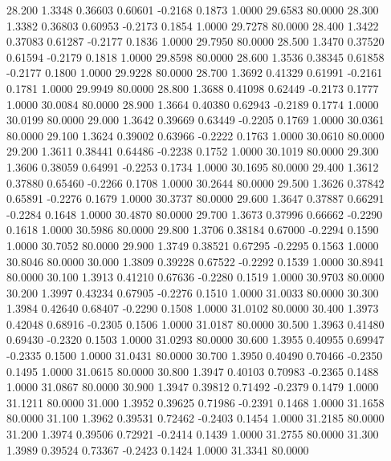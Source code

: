   28.200   1.3348   0.36603   0.60601  -0.2168   0.1873   1.0000  29.6583  80.0000
  28.300   1.3382   0.36803   0.60953  -0.2173   0.1854   1.0000  29.7278  80.0000
  28.400   1.3422   0.37083   0.61287  -0.2177   0.1836   1.0000  29.7950  80.0000
  28.500   1.3470   0.37520   0.61594  -0.2179   0.1818   1.0000  29.8598  80.0000
  28.600   1.3536   0.38345   0.61858  -0.2177   0.1800   1.0000  29.9228  80.0000
  28.700   1.3692   0.41329   0.61991  -0.2161   0.1781   1.0000  29.9949  80.0000
  28.800   1.3688   0.41098   0.62449  -0.2173   0.1777   1.0000  30.0084  80.0000
  28.900   1.3664   0.40380   0.62943  -0.2189   0.1774   1.0000  30.0199  80.0000
  29.000   1.3642   0.39669   0.63449  -0.2205   0.1769   1.0000  30.0361  80.0000
  29.100   1.3624   0.39002   0.63966  -0.2222   0.1763   1.0000  30.0610  80.0000
  29.200   1.3611   0.38441   0.64486  -0.2238   0.1752   1.0000  30.1019  80.0000
  29.300   1.3606   0.38059   0.64991  -0.2253   0.1734   1.0000  30.1695  80.0000
  29.400   1.3612   0.37880   0.65460  -0.2266   0.1708   1.0000  30.2644  80.0000
  29.500   1.3626   0.37842   0.65891  -0.2276   0.1679   1.0000  30.3737  80.0000
  29.600   1.3647   0.37887   0.66291  -0.2284   0.1648   1.0000  30.4870  80.0000
  29.700   1.3673   0.37996   0.66662  -0.2290   0.1618   1.0000  30.5986  80.0000
  29.800   1.3706   0.38184   0.67000  -0.2294   0.1590   1.0000  30.7052  80.0000
  29.900   1.3749   0.38521   0.67295  -0.2295   0.1563   1.0000  30.8046  80.0000
  30.000   1.3809   0.39228   0.67522  -0.2292   0.1539   1.0000  30.8941  80.0000
  30.100   1.3913   0.41210   0.67636  -0.2280   0.1519   1.0000  30.9703  80.0000
  30.200   1.3997   0.43234   0.67905  -0.2276   0.1510   1.0000  31.0033  80.0000
  30.300   1.3984   0.42640   0.68407  -0.2290   0.1508   1.0000  31.0102  80.0000
  30.400   1.3973   0.42048   0.68916  -0.2305   0.1506   1.0000  31.0187  80.0000
  30.500   1.3963   0.41480   0.69430  -0.2320   0.1503   1.0000  31.0293  80.0000
  30.600   1.3955   0.40955   0.69947  -0.2335   0.1500   1.0000  31.0431  80.0000
  30.700   1.3950   0.40490   0.70466  -0.2350   0.1495   1.0000  31.0615  80.0000
  30.800   1.3947   0.40103   0.70983  -0.2365   0.1488   1.0000  31.0867  80.0000
  30.900   1.3947   0.39812   0.71492  -0.2379   0.1479   1.0000  31.1211  80.0000
  31.000   1.3952   0.39625   0.71986  -0.2391   0.1468   1.0000  31.1658  80.0000
  31.100   1.3962   0.39531   0.72462  -0.2403   0.1454   1.0000  31.2185  80.0000
  31.200   1.3974   0.39506   0.72921  -0.2414   0.1439   1.0000  31.2755  80.0000
  31.300   1.3989   0.39524   0.73367  -0.2423   0.1424   1.0000  31.3341  80.0000
